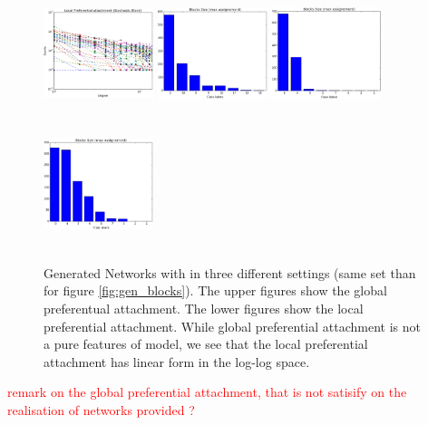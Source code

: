 \begin{figure}[h]
	\endminipage
	\includegraphics[width=3.2cm, height=3.7cm]{img/M_g_regular/figure_3}
	\endminipage
		\vspace{-0.4cm}
	\includegraphics[width=3.2cm, height=3.7cm]{img/M_g_peaks/figure_5}
	\endminipage
	\includegraphics[width=3.2cm, height=3.7cm]{img/M_g_power_law/figure_5} 
	\endminipage
	\includegraphics[width=3.2cm, height=3.7cm]{img/M_g_regular/figure_5}
	\endminipage
	\caption{Generated Networks with in three different settings (same set than for figure \ref{fig:gen_blocks}). The upper figures show the global preferentual attachment. The lower figures show the local preferential attachment. While global preferential attachment is not a pure features of model, we see that the local preferential attachment has linear form in the log-log space.}
	\label{fig:gen_burst_mmsb}
\end{figure}

\textcolor{red}{remark on the global preferential attachment, that is not satisify on the realisation of networks provided ?}


